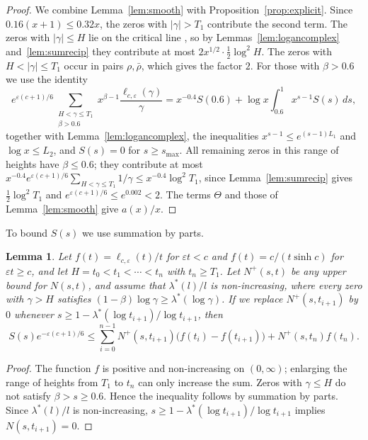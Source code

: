 \documentclass[11pt]{amsart}
\numberwithin{equation}{section}
\newtheorem{lemma}[theorem]{Lemma}
\theoremstyle{definition}
\theoremstyle{remark}
\newcommand{\eps}{\varepsilon}
\begin{document}
\begin{proof}
We combine Lemma~\ref{lem:smooth} with Proposition~\ref{prop:explicit}.
Since $0.16(x+1) \leq 0.32x$, the zeros with $|\gamma| > T_1$ contribute the second term.
The zeros with $|\gamma| \leq H$ lie on the critical line \cite{PlattTrudgianRH}, so by Lemmas~\ref{lem:logancomplex} and~\ref{lem:sumrecip} they contribute at most $2x^{1/2}\cdot\frac12\log^2H$.
The zeros with $H < |\gamma| \leq T_1$ occur in pairs $\rho, \bar\rho$, which gives the factor $2$.
For those with $\beta > 0.6$ we use the identity
\[
e^{\eps(c+1)/6}\sum_{\substack{H<\gamma\leq T_1\\ \beta > 0.6}}x^{\beta-1}\frac{\ell_{c,\eps}(\gamma)}{\gamma} = x^{-0.4}S(0.6) + \log x\int_{0.6}^1x^{s-1}S(s)\,ds,
\]
together with Lemma~\ref{lem:logancomplex}, the inequalities $x^{s-1} \leq e^{(s-1)L_1}$ and $\log x \leq L_2$, and $S(s) = 0$ for $s \geq s_{\max}$.
All remaining zeros in this range of heights have $\beta \leq 0.6$; they contribute at most $x^{-0.4}e^{\eps(c+1)/6}\sum_{H<\gamma\leq T_1}1/\gamma \leq x^{-0.4}\log^2T_1$, since Lemma~\ref{lem:sumrecip} gives $\frac12\log^2T_1$ and $e^{\eps(c+1)/6} \leq e^{0.002} < 2$.
The terms $\Theta$ and those of Lemma~\ref{lem:smooth} give $a(x)/x$.
\end{proof}

To bound $S(s)$ we use summation by parts.

\begin{lemma}\label{lem:stieltjes}
Let $f(t) = \ell_{c,\eps}(t)/t$ for $\eps t < c$ and $f(t) = c/(t\sinh c)$ for $\eps t \geq c$, and let $H = t_0 < t_1 < \cdots < t_n$ with $t_n \geq T_1$.
Let $N^+(s,t)$ be any upper bound for $N(s,t)$, and assume that $\lambda^*(l)/l$ is non-increasing, where every zero with $\gamma > H$ satisfies $(1-\beta)\log\gamma \geq \lambda^*(\log\gamma)$.
If we replace $N^+(s, t_{i+1})$ by $0$ whenever $s \geq 1 - \lambda^*(\log t_{i+1})/\log t_{i+1}$, then
\[
S(s)e^{-\eps(c+1)/6} \leq \sum_{i=0}^{n-1}N^+(s,t_{i+1})\big(f(t_i) - f(t_{i+1})\big) + N^+(s,t_n)f(t_n).
\]
\end{lemma}

\begin{proof}
The function $f$ is positive and non-increasing on $(0,\infty)$; enlarging the range of heights from $T_1$ to $t_n$ can only increase the sum.
Zeros with $\gamma \leq H$ do not satisfy $\beta > s \geq 0.6$.
Hence the inequality follows by summation by parts.
Since $\lambda^*(l)/l$ is non-increasing, $s \geq 1 - \lambda^*(\log t_{i+1})/\log t_{i+1}$ implies $N(s, t_{i+1}) = 0$.
\end{proof}
\end{document}
